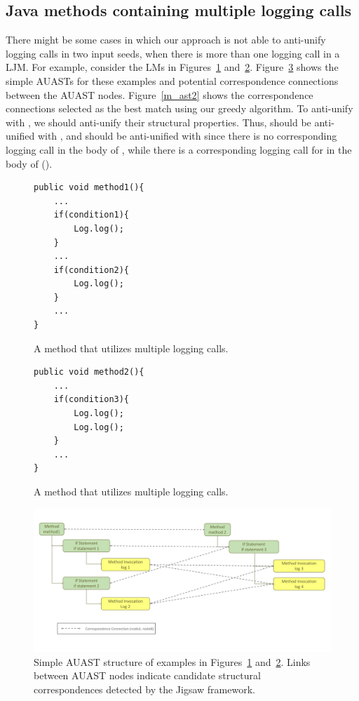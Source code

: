 \subsection{Java methods containing multiple logging calls} \label{meth-multipleLogs}
There might be some cases in which our approach is not able to anti-unify logging calls in two input seeds, when there is more than one logging call in a LJM. For example, consider the LMs in Figures~\ref{multiple1} and~\ref{multiple2}. Figure~\ref{mast_1} shows the simple AUASTs for these examples and potential correspondence connections between the AUAST nodes. Figure~\ref{m_ast2} shows the correspondence connections selected as the best match using our greedy algorithm. To anti-unify  with , we should anti-unify their structural properties. Thus,  should be anti-unified with , and  should be anti-unified with \NIL{} since there is no corresponding logging call in the body of , while there is a corresponding logging call for  in the body of  ().


\begin{figure}[H]
\def\baselinestretch{1}
\begin{lstlisting}
public void method1(){
	...
	if(condition1){
		Log.log();
	}
	...
	if(condition2){
		Log.log();
	}
	...
}
\end{lstlisting}
\caption{A  method that utilizes multiple logging calls.\label{multiple1}}
\end{figure}



\begin{figure}[H]
\def\baselinestretch{1}
\begin{lstlisting}
public void method2(){
	...
	if(condition3){
		Log.log();
		Log.log();
	}
	...
}
\end{lstlisting}
\caption{A  method that utilizes multiple logging calls.\label{multiple2}}
\end{figure}

\begin{figure} [H]
  \centering\includegraphics [width = \textwidth]{Drawing4/multipleLogging.pdf}
  \caption{Simple AUAST structure of examples in Figures~\ref{multiple1} and~\ref{multiple2}. Links between AUAST nodes indicate candidate structural correspondences detected by the Jigsaw framework.}
  \label{mast_1}
\end{figure}


